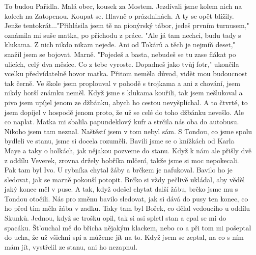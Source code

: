 

To budou Pařidla. Malá obec, kousek za Mostem. Jezdívali jsme kolem
nich na kolech na Zatopenou. Koupat se. Hlavně o prázdninách. A ty se
opět blížily. Jenže tentokrát..."Přihlásila jsem tě na pionýrský
tábor, jedeš prvním turnusem," oznámila mi suše matka, po příchodu z
práce. "Ale já tam nechci, budu tady s klukama. Z nich nikdo nikam
nejede. Ani od Tokárů a těch je nejmíň deset," snažil jsem se bojovat.
Marně. "Pojedeš a basta, nebudeš se tu zase flákat po ulicích, celý
dva měsíce. Co z tebe vyroste. Dopadneš jako tvůj fotr," ukončila
vcelku předvídatelně hovor matka. Přitom neměla důvod, vidět mou
budoucnost tak černě. Ve škole jsem proplouval v pohodě s trojkama a
ani z chování, jsem nikdy horší známku neměl. Když jsme s klukama
kouřili, tak jsem nešlukoval a pivo jsem upíjel jenom ze džbánku,
abych ho cestou nevyšplíchal. A to čtvrté, to jsem dopíjel v hospodě
jenom proto, že už se celé do toho džbánku nevešlo. Ale co naplat.
Matka mi sbalila papundeklový kufr a strčila nás oba do autobusu.
Nikoho jsem tam neznal. Naštěstí jsem v tom nebyl sám. S Tondou, co
jsme spolu bydleli ve stanu, jsme si docela rozuměli. Bavili jsme se o
knížkách od Karla Maye a taky o holkách, jak nějakou pozveme do stanu.
Když k nám ale přišly dvě z oddílu Veverek, zrovna držely bobříka
mlčení, takže jsme si moc nepokecali. Pak tam byl Ivo. U rybníka
chytal žáby a brčkem je nafukoval. Bavilo ho je sledovat, jak se marně
pokouší potopit. Brčko si vždy pečlivě ukládal, aby věděl jaký konec
měl v puse. A tak, když odešel chytat další žábu, brčko jsme mu s
Tondou otočili. Nás pro změnu bavilo sledovat, jak si dává do pusy ten
konec, co ho před tím měla žába v zadku. Taky tam byl Bořek, co dělal
vedoucího u oddílu Skunků. Jednou, když se trošku opil, tak si asi
spletl stan a cpal se mi do spacáku. Št'ouchal mě do břicha nějakým
klackem, nebo co a při tom mi pošeptal do ucha, že už všichni spí a
můžeme jít na to. Když jsem se zeptal, na co s ním mám jít, vystřelil
ze stanu, ani ho nezapnul. 
